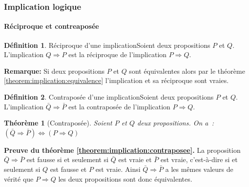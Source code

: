 \documentclass[10pt,notheorems]{beamer}
\theoremstyle{plain}
\newtheorem{theorem}{Théorème}
\theoremstyle{definition} %
\newtheorem{definition}{Définition}
\begin{document}
\begin{frame}
  \frametitle{Implication logique}
  \framesubtitle{Réciproque et contreaposée}

  \begin{definition}{Réciproque d'une implication}\label{def:implication:equivalence}
    Soient deux propositions $P$ et $Q$. L'implication $Q\Rightarrow P$ est la réciproque de l'implication $P\Rightarrow Q$. 
  \end{definition}

  \bigskip

  \textbf{Remarque:} Si deux propositions $P$ et $Q$ sont équivalentes alors par le théorème \autoref{theorem:implication:equivalence} l'implication et sa réciproque sont vraies.

  \bigskip

  \begin{definition}{Contraposée d'une implication}\label{def:implication:contraposee}
    Soient deux propositions $P$ et $Q$. L'implication $\bar Q\Rightarrow \bar P$ est la contraposée de l'implication $P\Rightarrow Q$.
  \end{definition}

  \bigskip

  \begin{theorem}[Contraposée]\label{theorem:implication:contraposee}
    Soient $P$ et $Q$ deux propositions. On a : $(\bar Q \Rightarrow \bar P) \Leftrightarrow (P\Rightarrow Q)$
  \end{theorem}
\end{frame}

\begin{notes}

  \textbf{Preuve du théorème \autoref{theorem:implication:contraposee}.} La proposition
  $\bar Q \Rightarrow \bar P$ est fausse si et seulement si $\bar Q$
  est vraie et $\bar P$ est vraie, c'est-à-dire si et seulement si $Q$
  est fausse et $P$ est vraie. Ainsi $\bar Q \Rightarrow \bar P$ a les
  mêmes valeurs de vérité que $P\Rightarrow Q$ les deux propositions
  sont donc équivalentes.

\end{notes}
\end{document}
